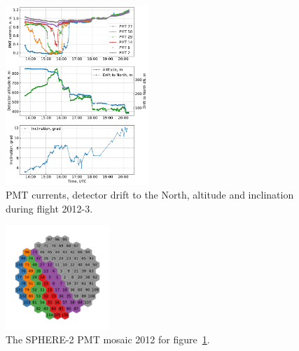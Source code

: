 \documentclass[final,5p,times,twocolumn]{elsarticle}
\begin{document}
\begin{figure}[t]
    \includegraphics[width=0.48\textwidth]{figs/2012-3_currents_H_dN.pdf}
    \caption{PMT currents, detector drift to the North, altitude and  inclination during flight 2012-3.}
    \label{fig:2012-3_currents}
\end{figure}
\begin{figure}[tb]
\centering
    \includegraphics[width=0.35\textwidth]{figs/2012-3_retina_all.pdf}
    \caption{The SPHERE-2 PMT mosaic 2012 for figure~\ref{fig:2012-3_currents}.}
    \label{fig:2012-3_retina}
\end{figure}
\end{document}
